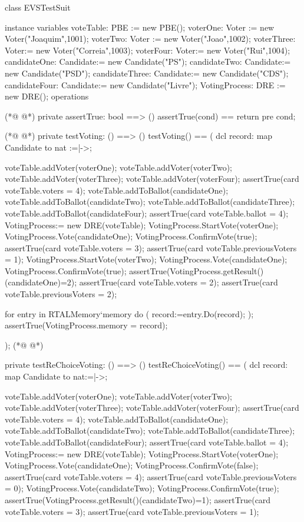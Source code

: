 \begin{vdmpp}
class EVSTestSuit

instance variables
 voteTable: PBE := new PBE();
 voterOne: Voter := new Voter("Joaquim",1001);
 voterTwo: Voter :=  new Voter("Joao",1002);
 voterThree: Voter:= new Voter("Correia",1003);
 voterFour: Voter:= new Voter("Rui",1004);
 candidateOne: Candidate:= new Candidate("PS");
 candidateTwo: Candidate:= new Candidate("PSD");
 candidateThree: Candidate:= new Candidate("CDS");
 candidateFour: Candidate:= new Candidate("Livre");
 VotingProcess: DRE := new DRE();
operations

(*@
\label{assertTrue:16}
@*)
private assertTrue: bool ==> ()
 assertTrue(cond) == return
 pre cond;

(*@
\label{testVoting:20}
@*)
private testVoting: () ==> ()
testVoting() ==
(
 dcl record: map Candidate to nat :={|->};
 
 voteTable.addVoter(voterOne);
 voteTable.addVoter(voterTwo);
 voteTable.addVoter(voterThree);
 voteTable.addVoter(voterFour);
 assertTrue(card voteTable.voters = 4);
 voteTable.addToBallot(candidateOne);
 voteTable.addToBallot(candidateTwo);
 voteTable.addToBallot(candidateThree);
 voteTable.addToBallot(candidateFour);
 assertTrue(card voteTable.ballot = 4);
 VotingProcess:= new DRE(voteTable);
 VotingProcess.StartVote(voterOne);
 VotingProcess.Vote(candidateOne);
 VotingProcess.ConfirmVote(true);
 assertTrue(card voteTable.voters = 3);
 assertTrue(card voteTable.previousVoters = 1);
 VotingProcess.StartVote(voterTwo);
 VotingProcess.Vote(candidateOne);
 VotingProcess.ConfirmVote(true);
 assertTrue(VotingProcess.getResult()(candidateOne)=2);
 assertTrue(card voteTable.voters = 2);
 assertTrue(card voteTable.previousVoters = 2);
 
 for entry in RTALMemory`memory 
  do (
    record:=entry.Do(record);
  );
  assertTrue(VotingProcess.memory = record);
  
);
(*@
\label{testReChoiceVoting:55}
@*)

private testReChoiceVoting: () ==> ()
testReChoiceVoting() ==
( 
 dcl record: map Candidate to nat:={|->};
 
 voteTable.addVoter(voterOne);
 voteTable.addVoter(voterTwo);
 voteTable.addVoter(voterThree);
 voteTable.addVoter(voterFour);
 assertTrue(card voteTable.voters = 4);
 voteTable.addToBallot(candidateOne);
 voteTable.addToBallot(candidateTwo);
 voteTable.addToBallot(candidateThree);
 voteTable.addToBallot(candidateFour);
 assertTrue(card voteTable.ballot = 4);
 VotingProcess:= new DRE(voteTable);
 VotingProcess.StartVote(voterOne);
 VotingProcess.Vote(candidateOne);
 VotingProcess.ConfirmVote(false);
 assertTrue(card voteTable.voters = 4);
 assertTrue(card voteTable.previousVoters = 0);
 VotingProcess.Vote(candidateTwo);
 VotingProcess.ConfirmVote(true);
 assertTrue(VotingProcess.getResult()(candidateTwo)=1);
 assertTrue(card voteTable.voters = 3);
 assertTrue(card voteTable.previousVoters = 1);
 

\end{vdmpp}
